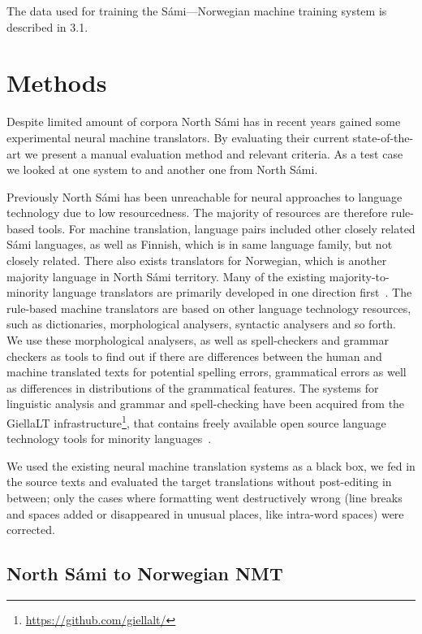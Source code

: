 \documentclass{flammie}
\begin{document}
The data used for training the Sámi---Norwegian machine training system is described in 3.1.




\section{Methods}

Despite limited amount of corpora North Sámi has in recent years gained some
experimental neural machine translators.  By evaluating their current
state-of-the-art we present a manual evaluation method and relevant criteria. As
a test case we looked at one system to and another one from North Sámi.

Previously North Sámi has been unreachable for neural approaches to language
technology due to low resourcedness.  The majority of resources are therefore
rule-based tools.  For machine translation, language pairs included other
closely related Sámi languages, as well as Finnish, which is in same language
family, but not closely related.  There also exists translators for Norwegian,
which is another majority language in North Sámi territory.  Many of the
existing majority-to-minority language translators are primarily developed in
one direction first~\cite{trosterud-unhammer-2012-evaluating}.  The rule-based
machine translators are based on other language technology resources, such as
dictionaries, morphological analysers, syntactic analysers and so forth.  We use
these morphological analysers, as well as spell-checkers and grammar checkers as
tools to find out if there are differences between the human and machine
translated texts for potential spelling errors, grammatical errors as well as
differences in distributions of the grammatical features.  The systems for
linguistic analysis and grammar and spell-checking have been acquired from the
GiellaLT infrastructure\footnote{\url{https://github.com/giellalt/}}, that
contains freely available open source language technology tools for minority
languages~\cite{pirinen-etal-2023-giellalt}.

We used the existing neural machine translation systems as a black box, we fed
in the source texts and evaluated the target translations without post-editing
in between; only the cases where formatting went destructively wrong (line
breaks and spaces added or disappeared in unusual places, like intra-word
spaces) were corrected.



\subsection{North Sámi to Norwegian NMT}\label{smenob}
\end{document}
